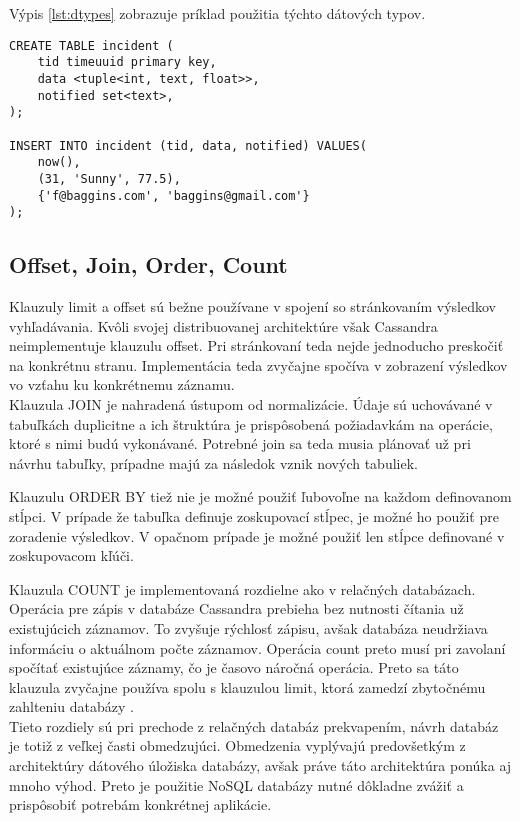 	Výpis \ref{lst:dtypes} zobrazuje príklad použitia týchto dátových typov.
	\begin{lstlisting}[label=lst:dtypes,caption=Príklad použitia dátových typov databázy Cassandra]
CREATE TABLE incident (
	tid timeuuid primary key,
	data <tuple<int, text, float>>,
	notified set<text>,
);

INSERT INTO incident (tid, data, notified) VALUES(
	now(),
	(31, 'Sunny', 77.5),
	{'f@baggins.com', 'baggins@gmail.com'}
);
	\end{lstlisting}

	\subsection{Offset, Join, Order, Count}
	Klauzuly limit a offset sú bežne používane v spojení so stránkovaním výsledkov vyhľadávania. Kvôli svojej distribuovanej architektúre však Cassandra neimplementuje klauzulu offset. Pri stránkovaní teda nejde jednoducho preskočiť na konkrétnu stranu. Implementácia teda zvyčajne spočíva v zobrazení výsledkov vo vzťahu ku konkrétnemu záznamu.\\
	
	Klauzula JOIN je nahradená ústupom od normalizácie. Údaje sú uchovávané v tabuľkách duplicitne a ich štruktúra je prispôsobená požiadavkám na operácie, ktoré s nimi budú vykonávané. Potrebné join sa teda musia plánovať už pri návrhu tabuľky, prípadne majú za následok vznik nových tabuliek.
	
	Klauzulu ORDER BY tiež nie je možné použiť ľubovoľne na každom definovanom stĺpci. V prípade že tabuľka definuje zoskupovací stĺpec, je možné ho použiť pre zoradenie výsledkov. V opačnom prípade je možné použiť len stĺpce definované v zoskupovacom kľúči.
	
	Klauzula COUNT je implementovaná rozdielne ako v relačných databázach. Operácia pre zápis v databáze Cassandra prebieha bez nutnosti čítania už existujúcich záznamov. To zvyšuje rýchlosť zápisu, avšak databáza neudržiava informáciu o aktuálnom počte záznamov. Operácia count preto musí pri zavolaní spočítať existujúce záznamy, čo je časovo náročná operácia. Preto sa táto klauzula zvyčajne používa spolu s klauzulou limit, ktorá zamedzí zbytočnému zahlteniu databázy \cite{cascount}. \\
	
	Tieto rozdiely sú pri prechode z relačných databáz prekvapením, návrh databáz je totiž z veľkej časti obmedzujúci. Obmedzenia vyplývajú predovšetkým z architektúry dátového úložiska databázy, avšak práve táto architektúra ponúka aj mnoho výhod. Preto je použitie NoSQL databázy nutné dôkladne zvážiť a prispôsobiť potrebám konkrétnej aplikácie.
	
